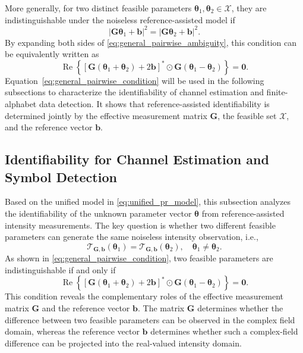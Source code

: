 \documentclass[journal]{IEEEtran}
\begin{document}
More generally, for two distinct feasible parameters $\boldsymbol{\theta}_1,\boldsymbol{\theta}_2\in\mathcal{X}$, they are indistinguishable under the noiseless reference-assisted model if
\begin{equation}
|\mathbf{G}\boldsymbol{\theta}_1+\mathbf{b}|^2
=
|\mathbf{G}\boldsymbol{\theta}_2+\mathbf{b}|^2.
\label{eq:general_pairwise_ambiguity}
\end{equation}
By expanding both sides of \eqref{eq:general_pairwise_ambiguity}, this condition can be equivalently written as
\begin{equation}
\operatorname{Re}
\left\{
\left[
\mathbf{G}(\boldsymbol{\theta}_1+\boldsymbol{\theta}_2)
+
2\mathbf{b}
\right]^*
\odot
\mathbf{G}(\boldsymbol{\theta}_1-\boldsymbol{\theta}_2)
\right\}
=
\mathbf{0}.
\label{eq:general_pairwise_condition}
\end{equation}
Equation~\eqref{eq:general_pairwise_condition} will be used in the following subsections to characterize the identifiability of channel estimation and finite-alphabet data detection. 
It shows that reference-assisted identifiability is determined jointly by the effective measurement matrix $\mathbf{G}$, the feasible set $\mathcal{X}$, and the reference vector $\mathbf{b}$.


\subsection{Identifiability for Channel Estimation and Symbol Detection}

Based on the unified model in \eqref{eq:unified_pr_model}, this subsection analyzes the identifiability of the unknown parameter vector $\boldsymbol{\theta}$ from reference-assisted intensity measurements. 
The key question is whether two different feasible parameters can generate the same noiseless intensity observation, i.e.,
\begin{equation}
\mathcal{T}_{\mathbf{G},\mathbf{b}}(\boldsymbol{\theta}_1)
=
\mathcal{T}_{\mathbf{G},\mathbf{b}}(\boldsymbol{\theta}_2),
\quad
\boldsymbol{\theta}_1\neq \boldsymbol{\theta}_2.
\end{equation}
As shown in \eqref{eq:general_pairwise_condition}, two feasible parameters are indistinguishable if and only if
\begin{equation}
\operatorname{Re}
\left\{
\left[
\mathbf{G}(\boldsymbol{\theta}_1+\boldsymbol{\theta}_2)
+
2\mathbf{b}
\right]^*
\odot
\mathbf{G}(\boldsymbol{\theta}_1-\boldsymbol{\theta}_2)
\right\}
=
\mathbf{0}.
\label{eq:pairwise_ambiguity_condition_main}
\end{equation}
This condition reveals the complementary roles of the effective measurement matrix $\mathbf{G}$ and the reference vector $\mathbf{b}$. 
The matrix $\mathbf{G}$ determines whether the difference between two feasible parameters can be observed in the complex field domain, whereas the reference vector $\mathbf{b}$ determines whether such a complex-field difference can be projected into the real-valued intensity domain.
\end{document}
